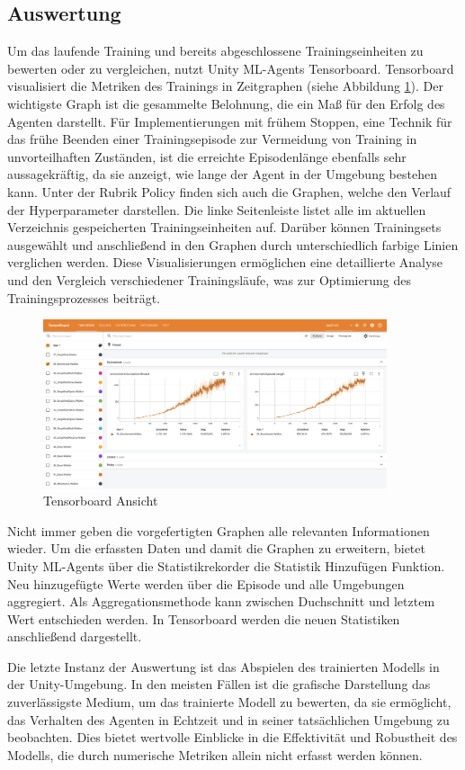 \subsection{Auswertung}
Um das laufende Training und bereits abgeschlossene Trainingseinheiten zu bewerten oder zu vergleichen, nutzt Unity ML-Agents Tensorboard. Tensorboard visualisiert die Metriken des Trainings in Zeitgraphen (siehe Abbildung \ref{fig:tensorboard}). Der wichtigste Graph ist die gesammelte Belohnung, die ein Maß für den Erfolg des Agenten darstellt. Für Implementierungen mit frühem Stoppen, eine Technik für das frühe Beenden einer Trainingsepisode zur Vermeidung von Training in unvorteilhaften Zuständen, ist die erreichte Episodenlänge ebenfalls sehr aussagekräftig, da sie anzeigt, wie lange der Agent in der Umgebung bestehen kann. Unter der Rubrik \grqq{}Policy\grqq{} finden sich auch die Graphen, welche den Verlauf der Hyperparameter darstellen. Die linke Seitenleiste listet alle im aktuellen Verzeichnis gespeicherten Trainingseinheiten auf. Darüber können Trainingsets ausgewählt und anschließend in den Graphen durch unterschiedlich farbige Linien verglichen werden. Diese Visualisierungen ermöglichen eine detaillierte Analyse und den Vergleich verschiedener Trainingsläufe, was zur Optimierung des Trainingsprozesses beiträgt.

\begin{figure}[H]
  \centering  
  \includegraphics[width=0.9\textwidth]{img/tensorboard}
  \caption{Tensorboard Ansicht}
  \label{fig:tensorboard}
\end{figure}

Nicht immer geben die vorgefertigten Graphen alle relevanten Informationen wieder. Um die erfassten Daten und damit die Graphen zu erweitern, bietet Unity ML-Agents über die Statistikrekorder die \grqq{}Statistik Hinzufügen\grqq{} Funktion. Neu hinzugefügte Werte werden über die Episode und alle Umgebungen aggregiert. Als Aggregationsmethode kann zwischen Duchschnitt und letztem Wert entschieden werden. In Tensorboard werden die neuen Statistiken anschließend dargestellt.

Die letzte Instanz der Auswertung ist das Abspielen des trainierten Modells in der Unity-Umgebung. In den meisten Fällen ist die grafische Darstellung das zuverlässigste Medium, um das trainierte Modell zu bewerten, da sie ermöglicht, das Verhalten des Agenten in Echtzeit und in seiner tatsächlichen Umgebung zu beobachten. Dies bietet wertvolle Einblicke in die Effektivität und Robustheit des Modells, die durch numerische Metriken allein nicht erfasst werden können.